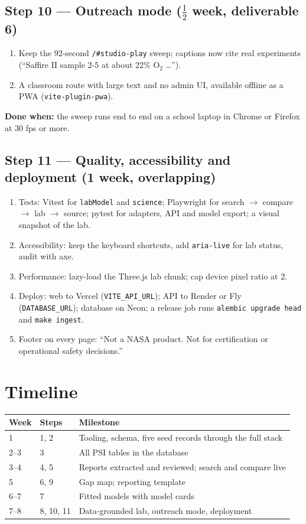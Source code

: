 \documentclass[11pt,a4paper]{article}
\newcommand{\Otwo}{\ensuremath{\mathrm{O_2}}}
\newcommand{\code}[1]{\texttt{#1}}
\newcommand{\done}[1]{\begin{donebox}\textbf{Done when:} #1\end{donebox}}
\begin{document}
\subsection{Step 10 --- Outreach mode \hfill\normalfont\small ($\tfrac{1}{2}$ week, deliverable 6)}
\begin{enumerate}
  \item Keep the 92-second \code{/\#studio-play} sweep; captions now cite real experiments (``Saffire II sample 2-5 at about 22\% \Otwo{} \dots'').
  \item A classroom route with large text and no admin UI, available offline as a PWA (\code{vite-plugin-pwa}).
\end{enumerate}
\done{the sweep runs end to end on a school laptop in Chrome or Firefox at 30 fps or more.}

\subsection{Step 11 --- Quality, accessibility and deployment \hfill\normalfont\small (1 week, overlapping)}
\begin{enumerate}
  \item Tests: Vitest for \code{labModel} and \code{science}; Playwright for search $\rightarrow$ compare $\rightarrow$ lab $\rightarrow$ source; pytest for adapters, API and model export; a visual snapshot of the lab.
  \item Accessibility: keep the keyboard shortcuts, add \code{aria-live} for lab status, audit with axe.
  \item Performance: lazy-load the Three.js lab chunk; cap device pixel ratio at 2.
  \item Deploy: web to Vercel (\code{VITE\_API\_URL}); API to Render or Fly (\code{DATABASE\_URL}); database on Neon; a release job runs \code{alembic upgrade head} and \code{make ingest}.
  \item Footer on every page: ``Not a NASA product. Not for certification or operational safety decisions.''
\end{enumerate}

\section{Timeline}

\begin{tabularx}{\linewidth}{@{}p{2cm} p{3.2cm} L@{}}
\toprule
\textbf{Week} & \textbf{Steps} & \textbf{Milestone}\\
 & 1, 2 & Tooling, schema, five seed records through the full stack\\
2--3 & 3 & All PSI tables in the database\\
3--4 & 4, 5 & Reports extracted and reviewed; search and compare live\\
5 & 6, 9 & Gap map; reporting template\\
6--7 & 7 & Fitted models with model cards\\
7--8 & 8, 10, 11 & Data-grounded lab, outreach mode, deployment\\
\bottomrule
\end{tabularx}
\end{document}
